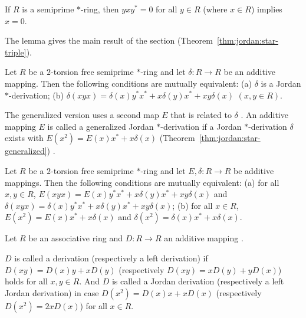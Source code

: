 \begin{lemma}\label{lem:jordan:star-semiprime}
If $R$ is a semiprime $\ast$-ring, then $yxy^{\ast}=0$ for all $y\in R$ (where $x\in R$) implies
$x=0$.
\end{lemma}

The lemma gives the main result of the section (Theorem~\ref{thm:jordan:star-triple}).

\begin{theorem}\label{thm:jordan:star-triple}
Let $R$ be a $2$-torsion free semiprime $\ast$-ring and let $\delta\colon R\to R$ be an additive
mapping. Then the following conditions are mutually equivalent:
(a) $\delta$ is a Jordan $\ast$-derivation;
(b) $\delta(xyx)=\delta(x)y^{\ast}x^{\ast}+x\delta(y)x^{\ast}+xy\delta(x)$ $(x,y\in R)$.
\end{theorem}

The generalized version uses a second map $E$ that is related to $\delta$
\cite[p.~417]{FosnerIlisevic2008}. An additive mapping $E$ is called a generalized Jordan
$\ast$-derivation if a Jordan $\ast$-derivation $\delta$ exists with $E(x^{2})=E(x)x^{\ast}+x\delta(x)$ (Theorem~\ref{thm:jordan:star-generalized})
\cite[p.~417]{FosnerIlisevic2008}.\begin{theorem}\label{thm:jordan:star-generalized}
Let $R$ be a $2$-torsion free semiprime $\ast$-ring and let $E,\delta\colon R\to R$ be additive
mappings. Then the following conditions are mutually equivalent:
(a) for all $x,y\in R$, $E(xyx)=E(x)y^{\ast}x^{\ast}+x\delta(y)x^{\ast}+xy\delta(x)$ and
$\delta(xyx)=\delta(x)y^{\ast}x^{\ast}+x\delta(y)x^{\ast}+xy\delta(x)$;
(b) for all $x\in R$, $E(x^{2})=E(x)x^{\ast}+x\delta(x)$ and
$\delta(x^{2})=\delta(x)x^{\ast}+x\delta(x)$.
\end{theorem}

Let $R$ be an associative ring and $D\colon R\to R$ an
additive mapping \cite[p.~1]{Vukman1997}.

\begin{definition}\label{def:jordan:left}
$D$ is called a derivation (respectively a left derivation) if $D(xy)=D(x)y+xD(y)$ (respectively
$D(xy)=xD(y)+yD(x)$) holds for all $x,y\in R$. And $D$ is called a Jordan derivation (respectively a left
Jordan derivation) in case $D(x^{2})=D(x)x+xD(x)$ (respectively $D(x^{2})=2xD(x)$) for all $x\in R$.
\end{definition}

